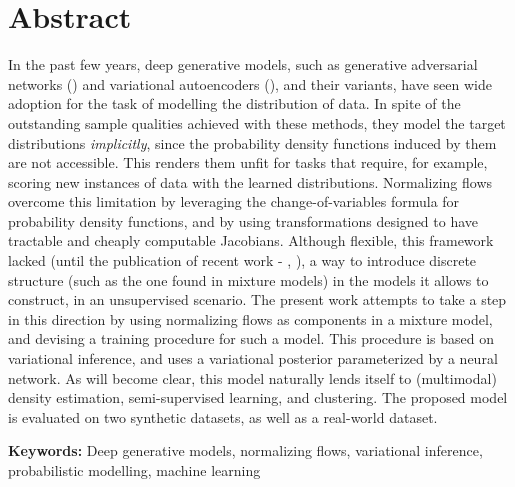 \section*{Abstract}


In the past few years, deep generative models, such as generative adversarial networks
(\autocite{GAN}) and variational autoencoders (\autocite{vaepaper}), and their variants,
have seen wide adoption for the task of modelling the distribution of data.
In spite of the outstanding sample qualities achieved with these methods,
they model the target distributions \emph{implicitly}, since the probability
density functions induced by them are not accessible. This renders them unfit for
tasks that require, for example, scoring new instances of data with the learned
distributions. Normalizing flows overcome this limitation by leveraging the
change-of-variables formula for probability density functions, and by using
transformations designed to have tractable and cheaply computable Jacobians. Although
flexible, this framework lacked (until the publication of recent work -
\autocite{semisuplearning_nflows}, \autocite{RAD}), a way to introduce discrete
structure (such as the one found in mixture models) in the models it allows to
construct, in an unsupervised scenario. The present work attempts to take a step
in this direction by using normalizing flows as components in a mixture model,
and devising a training procedure for such a model.
This procedure is based on variational inference, and uses a variational posterior
parameterized by a neural network. As will become clear, this model naturally
lends itself to (multimodal) density estimation, semi-supervised learning, and
clustering. The proposed model is evaluated on two synthetic datasets, as well
as a real-world dataset.
\vfill

\textbf{\Large Keywords:} Deep generative models, normalizing flows, variational
inference, probabilistic modelling, machine learning
